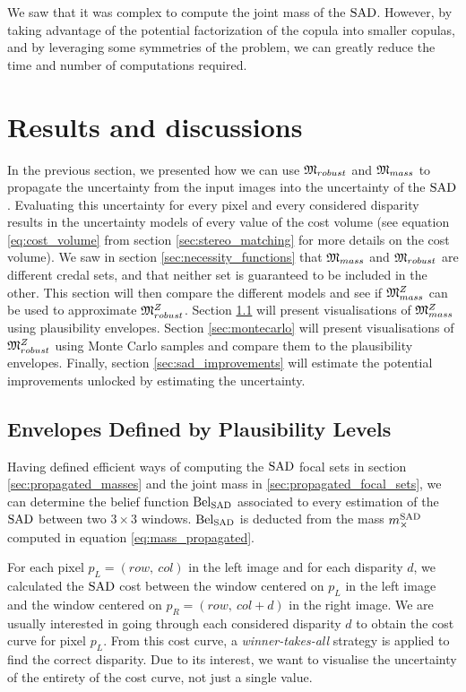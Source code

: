We saw that it was complex to compute the joint mass of the ${\mathrm{SAD}}$. However, by taking advantage of the potential factorization of the copula into smaller copulas, and by leveraging some symmetries of the problem, we can greatly reduce the time and number of computations required.

\section{Results and discussions}
In the previous section, we presented how we can use ${\mathfrak{M}}_{robust}$ and ${\mathfrak{M}}_{mass}$ to propagate the uncertainty from the input images into the uncertainty of the ${\mathrm{SAD}}$. Evaluating this uncertainty for every pixel and every considered disparity results in the uncertainty models of every value of the cost volume (see equation \ref{eq:cost_volume} from section \ref{sec:stereo_matching} for more details on the cost volume). We saw in section \ref{sec:necessity_functions} that ${\mathfrak{M}}_{mass}$ and ${\mathfrak{M}}_{robust}$ are different credal sets, and that neither set is guaranteed to be included in the other. This section will then compare the different models and see if ${\mathfrak{M}}^Z_{mass}$ can be used to approximate ${\mathfrak{M}}^Z_{robust}$. Section \ref{sec:envelopes_plausibility} will present visualisations of  ${\mathfrak{M}}^Z_{mass}$ using plausibility envelopes. Section \ref{sec:montecarlo} will present visualisations of ${\mathfrak{M}}^Z_{robust}$ using Monte Carlo samples and compare them to the plausibility envelopes. Finally, section \ref{sec:sad_improvements} will estimate the potential improvements unlocked by estimating the uncertainty.

\subsection{Envelopes Defined by Plausibility Levels}\label{sec:envelopes_plausibility}
Having defined efficient ways of computing the ${\mathrm{SAD}}$ focal sets in section \ref{sec:propagated_masses} and the joint mass in \ref{sec:propagated_focal_sets}, we can determine the belief function ${\mathrm{Bel}}_{\mathrm{SAD}}$ associated to every estimation of the ${\mathrm{SAD}}$ between two $3\times3$ windows. ${\mathrm{Bel}}_{\mathrm{SAD}}$ is deducted from the mass $m^{\mathrm{SAD}}_\times$ computed in equation \ref{eq:mass_propagated}.

For each pixel $p_L=(row, ~col)$ in the left image and for each disparity $d$, we calculated the ${\mathrm{SAD}}$ cost between the window centered on $p_L$ in the left image and the window centered on $p_R=(row, ~col+d)$ in the right image. We are usually interested in going through each considered disparity $d$ to obtain the cost curve for pixel $p_L$. From this cost curve, a \textit{winner-takes-all} strategy is applied to find the correct disparity. Due to its interest, we want to visualise the uncertainty of the entirety of the cost curve, not just a single value.

